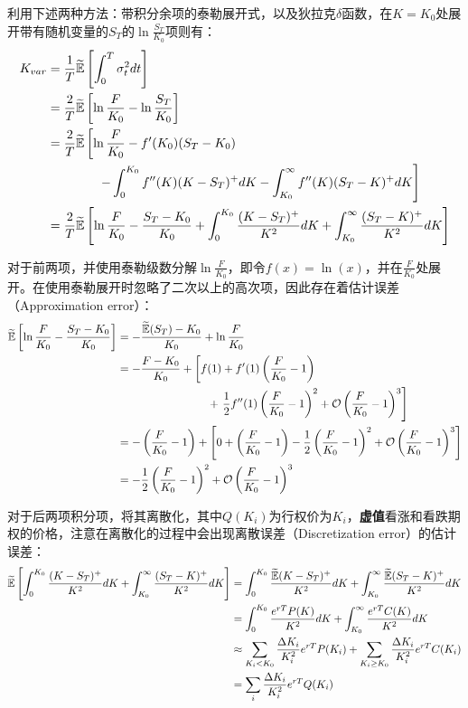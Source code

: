 \documentclass[11pt]{article}
\begin{document}
利用下述两种方法：带积分余项的泰勒展开式，以及狄拉克$\delta$函数，在$K=K_0$处展开带有随机变量的$S_T$的$\ln\frac{S_T}{K_0}$项则有：
\begin{align*}
    K_{var} &=  \frac{1}{T} \widetilde{\mathbb{E}} \left[ \int^T_0 \sigma^2_t dt \right] \\
    &= \frac{2}{T} \widetilde{\mathbb{E}} \left[\ln\frac{F}{K_0} - \ln\frac{S_T}{K_0}  \right] \\
    &= \frac{2}{T} \widetilde{\mathbb{E}} \left[ \ln\frac{F}{K_0}- f'(K_0) (S_T-K_0) \right. \\
    &\hspace{4em} \left. - \int^{K_0}_{0} f''(K) (K-S_T)^+ dK - \int^{\infty}_{K_0} f''(K) (S_T-K)^+ dK  \right] \\
    &= \frac{2}{T} \widetilde{\mathbb{E}} \left[ \ln\frac{F}{K_0} - \frac{S_T-K_0}{K_0} + \int^{K_0}_{0} \frac{(K-S_T)^+}{K^2} dK + \int^{\infty}_{K_0} \frac{(S_T-K)^+}{K^2} dK \right]
\end{align*}

对于前两项，并使用泰勒级数分解$\ln \frac{F}{K_0}$，即令$f(x) = \ln(x)$，并在$\frac{F}{K_0}$处展开。在使用泰勒展开时忽略了二次以上的高次项，因此存在着估计误差（Approximation error）：
\begin{align*}
    \widetilde{\mathbb{E}} \left[ \ln\frac{F}{K_0} - \frac{S_T-K_0}{K_0} \right]
    &= -\frac{\widetilde{\mathbb{E}}(S_T)-K_0}{K_0} + \ln \frac{F}{K_0} \\
    &= -\frac{F-K_0}{K_0} + \left[ f(1) + f'(1)\left(\frac{F}{K_0}-1\right) \right. \\
    &\hspace{8em} + \left. \frac{1}{2}f''(1)\left(\frac{F}{K_0}-1\right)^2 + \mathcal{O}\left( \frac{F}{K_0} - 1 \right)^3 \right] \\
    &= - \left( \frac{F}{K_0} -1 \right) + \left[ 0 + \left(\frac{F}{K_0} - 1\right) - \frac{1}{2} \left(\frac{F}{K_0} - 1\right)^2 + \mathcal{O}\left( \frac{F}{K_0} - 1 \right)^3 \right] \\
    &= - \frac{1}{2} \left(\frac{F}{K_0} - 1\right)^2 + \mathcal{O}\left( \frac{F}{K_0} - 1 \right)^3
\end{align*}

对于后两项积分项，将其离散化，其中$Q(K_i)$为行权价为$K_i$，\textbf{虚值}看涨和看跌期权的价格，注意在离散化的过程中会出现离散误差（Discretization error）的估计误差：
\begin{align*}
    \widetilde{\mathbb{E}} \left[ \int^{K_0}_{0} \frac{(K-S_T)^+}{K^2} dK + \int^{\infty}_{K_0} \frac{(S_T-K)^+}{K^2} dK \right]
    &= \int^{K_0}_{0} \frac{\widetilde{\mathbb{E}}(K-S_T)^+ }{K^2} dK + \int^{\infty}_{K_0} \frac{\widetilde{\mathbb{E}}(S_T-K)^+}{K^2} dK \\
    &= \int^{K_0}_{0} \frac{e^{rT}P(K)}{K^2} dK + \int^{\infty}_{K_0} \frac{e^{rT}C(K)}{K^2} dK \\
    &\approx \sum_{K_i < K_0} \frac{\Delta K_i}{K_i^2} e^{rT} P(K_i) + \sum_{K_i \geq K_0} \frac{\Delta K_i}{K_i^2} e^{rT} C(K_i) \\
    &= \sum_{i} \frac{\Delta K_i}{K_i^2} e^{rT} Q(K_i)
\end{align*}
\end{document}
